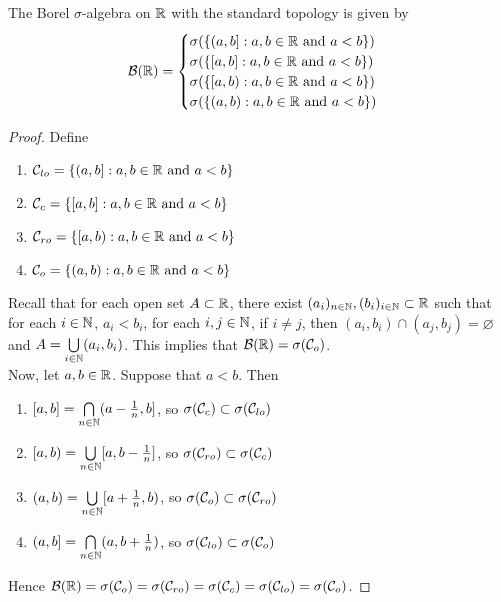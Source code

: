 \documentclass{book}
\begin{document}
	\begin{ex}  
		The Borel $\sigma$-algebra on $\mathbb{R}$ with the standard topology is given by 
		\[
		\mathcal{B}(\mathbb{R}) =
		\begin{cases}
			\sigma(\{(a,b]:a,b \in \mathbb{R} \text{ and } a<b\}) \\
			\sigma(\{[a,b]:a,b \in \mathbb{R} \text{ and } a<b\}) \\
			\sigma(\{[a,b):a,b \in \mathbb{R} \text{ and } a<b\}) \\
			\sigma(\{(a,b):a,b \in \mathbb{R} \text{ and } a<b\}) \\
		\end{cases}
		\]
	\end{ex}
	
	\begin{proof}
		Define 
		\begin{enumerate}
			\item $\mathcal{C}_{lo} = \{(a,b]:a,b \in \mathbb{R} \text{ and } a<b\}$\\
			\item $\mathcal{C}_{c} = \{[a,b]:a,b \in \mathbb{R} \text{ and } a<b\}$\\
			\item $\mathcal{C}_{ro} = \{[a,b):a,b \in \mathbb{R} \text{ and } a<b\}$\\
			\item $\mathcal{C}_{o} = \{(a,b):a,b \in \mathbb{R} \text{ and } a<b\}$\\
		\end{enumerate} 
		Recall that for each open set $A \subset \mathbb{R}$, there exist $(a_i)_{n \in \mathbb{N}}, (b_i)_{i \in \mathbb{N}} \subset \mathbb{R}$ such that for each $i \in \mathbb{N}$, $a_i < b_i$, for each $i,j \in \mathbb{N}$, if $i \neq j$, then $(a_i,b_i) \cap (a_j, b_j) = \varnothing$ and $A = \bigcup\limits_{i \in \mathbb{N}}(a_i, b_i)$. This implies that $\mathcal{B}(\mathbb{R}) = \sigma(\mathcal{C}_o)$. \vspace{2mm}\\
		Now, let $a,b \in \mathbb{R}$. Suppose that $a<b$. Then 
		\begin{enumerate}
			\item $[a,b] = \bigcap\limits_{n \in \mathbb{N}}(a- \frac{1}{n}, b]$, so $\sigma(\mathcal{C}_{c}) \subset \sigma(\mathcal{C}_{lo})$\\
			\item $[a,b) = \bigcup\limits_{n \in \mathbb{N}} [a,b-\frac{1}{n}]$, so $\sigma(\mathcal{C}_{ro}) \subset \sigma(\mathcal{C}_{c})$ \\
			\item $(a,b) = \bigcup\limits_{n \in \mathbb{N}} [a+\frac{1}{n},b)$, so $\sigma(\mathcal{C}_{o}) \subset \sigma(\mathcal{C}_{ro})$\\
			\item $(a,b] = \bigcap\limits_{n \in \mathbb{N}} (a,b+\frac{1}{n})$, so $\sigma(\mathcal{C}_{lo}) \subset \sigma(\mathcal{C}_{o})$\\
		\end{enumerate}
		Hence $\mathcal{B}(\mathbb{R}) = \sigma(\mathcal{C}_o) = \sigma(\mathcal{C}_{ro}) = \sigma(\mathcal{C}_{c}) = \sigma(\mathcal{C}_{lo}) = \sigma(\mathcal{C}_{o})$. 
	\end{proof}
\end{document}
